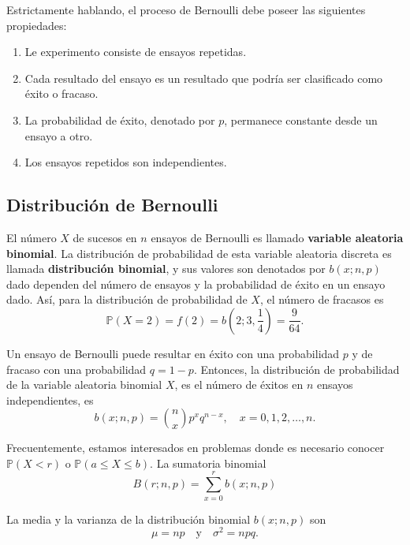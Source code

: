 Estrictamente hablando, el proceso de Bernoulli debe poseer las siguientes propiedades:
\begin{enumerate}
	\item Le experimento consiste de ensayos repetidas.
	\item Cada resultado del ensayo es un resultado que podría ser clasificado como éxito o fracaso.
	\item La probabilidad de éxito, denotado por $p$, permanece constante desde un ensayo a otro.
	\item Los ensayos repetidos son independientes.
\end{enumerate}

\subsection*{Distribución de Bernoulli}

El número $X$ de sucesos en $n$ ensayos de Bernoulli es llamado \textbf{variable aleatoria binomial}. La distribución de probabilidad de esta variable aleatoria discreta es llamada \textbf{distribución binomial}, y sus valores son denotados por $b\left(x;n,p\right)$ dado dependen del número de ensayos y la probabilidad de éxito en un ensayo dado. Así, para la distribución de probabilidad de $X$, el número de fracasos es
\begin{equation*}
\mathds{P}\left(X=2\right)=f(2)=b\left(2;3,\frac{1}{4}\right)=\frac{9}{64}.
\end{equation*}

\begin{definition}[]
Un ensayo de Bernoulli puede resultar en éxito con una probabilidad $p$ y de fracaso con una probabilidad $q=1-p$. Entonces, la distribución de probabilidad  de la variable aleatoria binomial $X$, es el número de éxitos en $n$ ensayos independientes, es
\begin{equation*}
b\left(x;n,p\right)=\binom{n}{x}p^{x}q^{n-x},\quad x=0,1,2,\ldots,n.
\end{equation*}
\end{definition}

Frecuentemente, estamos interesados en problemas donde es necesario conocer $\mathds{P}\left(X<r\right)$ o $\mathds{P}\left(a\le X\le b\right)$. La sumatoria binomial
\begin{equation*}
B\left(r;n,p\right)=\sum_{x=0}^{r}b\left(x;n,p\right)
\end{equation*}

\begin{theorem}[]
La media y la varianza de la distribución binomial $b\left(x;n,p\right)$ son
\begin{equation*}
\mu=np\quad\text{y}\quad\sigma^{2}=npq.
\end{equation*}
\end{theorem}

